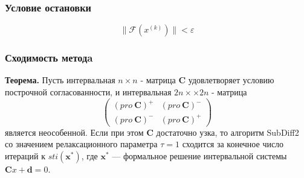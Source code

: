 \documentclass[../body.tex]{subfiles}
\begin{document}
            \subsubsection{Условие остановки}
                \begin{equation}
                    \| \mathcal{F}(x^{(k)}) \| < \varepsilon
                \end{equation}
        
    \subsubsection{Сходимость методa}
        \textbf{Теорема.}
        Пусть интервальная $n \times n$ - матрица $\textbf{C}$ удовлетворяет условию построчной согласованности, и интервальная $2n ×\times 2n$ - матрица
        \begin{equation*}
            \begin{pmatrix}
              (pro \ \textbf{C})^+ & (pro \ \textbf{C})^- \\
              (pro \ \textbf{C})^-& (pro \ \textbf{C})^+
            \end{pmatrix}
        \end{equation*}
        является неособенной. Если при этом \textbf{C} достаточно узка, то алгоритм SubDiff2 со значением релаксационного параметра $\tau = 1$ сходится за конечное число итераций к $sti (\textbf{x}^*)$, где $\textbf{x}^*$ — формальное
        решение интервальной системы $\textbf{C}x + \textbf{d} = 0$.
        
\end{document}
